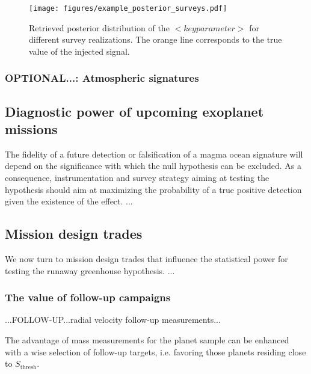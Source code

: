 \documentclass[twocolumn]{aastex631}
\begin{document}
\begin{figure}[ht!]
    \begin{centering}

        \texttt{[image: figures/example\_posterior\_surveys.pdf]}
        \caption{
            Retrieved posterior distribution of the $<key parameter>$ for different survey realizations.
            The orange line corresponds to the true value of the injected signal.
        }
        \label{fig:posterior_surveys}
    \end{centering}
\end{figure}

\subsubsection{OPTIONAL...: Atmospheric signatures}


\subsection{Diagnostic power of upcoming exoplanet missions}
The fidelity of a future detection or falsification of a magma ocean signature will depend on the significance with which the null hypothesis can be excluded.
As a consequence, instrumentation and survey strategy aiming at testing the hypothesis should aim at maximizing the probability of a true positive detection given the existence of the effect.
...

\subsection{Mission design trades}\label{sec:mission-design-trades}
We now turn to mission design trades that influence the statistical power for testing the runaway greenhouse hypothesis.
...
\subsubsection{The value of follow-up campaigns}
\begin{note}
...FOLLOW-UP...radial velocity follow-up measurements...

The advantage of mass measurements for the planet sample can be enhanced with a wise selection of follow-up targets, i.e. favoring those planets residing close to $S_\mathrm{thresh}$.
\end{note}
\end{document}
